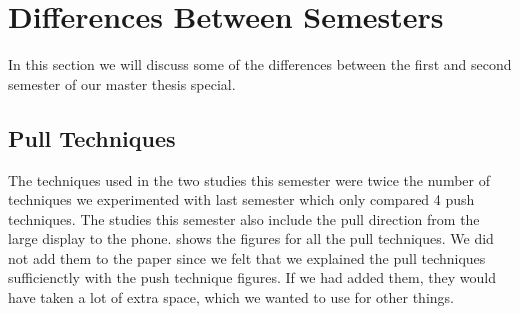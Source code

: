 \section*{Differences Between Semesters} \label{sec:experiments}
In this section we will discuss some of the differences between the first and second semester of our master thesis special. 

\subsection*{Pull Techniques}
The techniques used in the two studies this semester were twice the number of techniques we experimented with last semester which only compared 4 push techniques.
The studies this semester also include the pull direction from the large display to the phone.
 shows the figures for all the pull techniques. 
We did not add them to the paper since we felt that we explained the pull techniques sufficienctly with the push technique figures.
If we had added them, they would have taken a lot of extra space, which we wanted to use for other things. 


